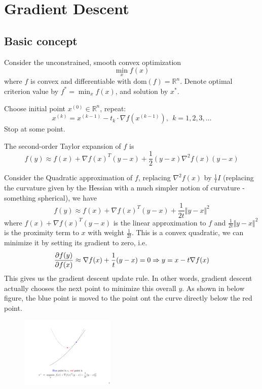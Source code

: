 \documentclass[a4paper]{article}
\begin{document}
{\section{Gradient Descent}
\subsection{Basic concept}
Consider the unconstrained, smooth convex optimization
\begin{equation}
  \min_x f(x) \nonumber
\end{equation}
where $f$ is convex and differentiable with $\text{dom}(f)=\mathbb{R}^n$. Denote optimal criterion value by $f^*= \min_x f(x)$, and solution by $x^*$.

\begin{defi} 
  Choose initial point $x^{(0)} \in \mathbb{R}^n$, repeat:
  \[
    x^{(k)} = x^{(k-1)} -t_k\cdot \nabla f(x^{(k-1)}), \ \ k=1,2,3,\ldots \nonumber
  \]
  Stop at some point.
\end{defi}

\noindent The second-order Taylor expansion of $f$ is
\begin{equation}
  f(y) \approx f(x) + \nabla f(x)^T(y-x) + \dfrac{1}{2}(y-x)\nabla^2 f(x)(y-x) \nonumber
\end{equation}

\noindent Consider the Quadratic approximation of $f$, replacing $\nabla^2 f(x)$ by $\tfrac{1}{t} I$ (replacing the curvature given by the Hessian with a much simpler notion of curvature - something spherical), we have 
\begin{equation}
  f(y) \approx f(x) + \nabla f(x)^T(y-x) + \dfrac{1}{2t}\Vert y-x \Vert^2 \nonumber
\end{equation}
where $f(x) + \nabla f(x)^T(y-x)$ is the linear approximation to $f$ and $\tfrac{1}{2t}\Vert y-x \Vert^2 \nonumber$ is the proximity term to $x$ with weight $\tfrac{1}{2t}$. This is a convex quadratic, we can minimize it by setting its gradient to zero, i.e.
\begin{equation}
  \dfrac{\partial f(y)}{ \partial f(x)} \approx \nabla f(x) + \dfrac{1}{t} (y-x) = 0 \\
  \Rightarrow y = x - t\nabla f(x)  \nonumber
\end{equation}
This gives us the gradient descent update rule. In other words, gradient descent actually chooses the next point to minimize this overall $y$. As shown in below figure, the blue point is moved to the point ont the curve directly below the red point.
\begin{figure}[htbp] 
  \centering 
  \includegraphics[width=0.4\textwidth]{img/gradient _descent _update.pdf} 
\end{figure}

}
\end{document}
